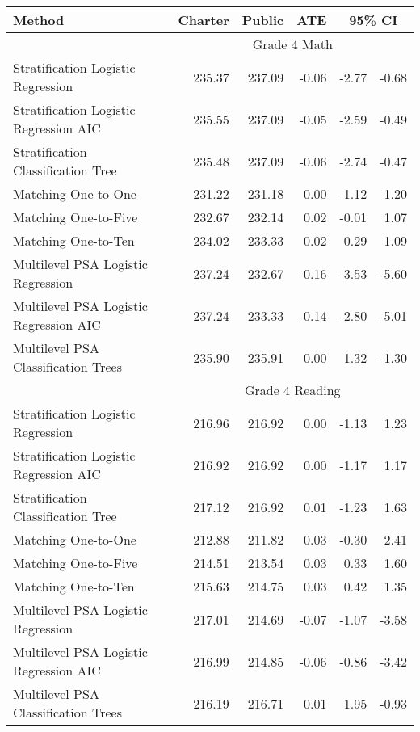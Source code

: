 \begin{table}[ht]
\centering
\begin{tabular}{lrrrrr}
  \hline Method & Charter & Public & ATE & \multicolumn{2}{c}{95\% CI} \\   \hline & \multicolumn{5}{c}{Grade 4 Math} \\ \cline{2-6} Stratification Logistic Regression & 235.37 & 237.09 & -0.06 & -2.77 & -0.68 \\ 
  Stratification Logistic Regression AIC & 235.55 & 237.09 & -0.05 & -2.59 & -0.49 \\ 
  Stratification Classification Tree & 235.48 & 237.09 & -0.06 & -2.74 & -0.47 \\ 
  Matching One-to-One & 231.22 & 231.18 & 0.00 & -1.12 & 1.20 \\ 
  Matching One-to-Five & 232.67 & 232.14 & 0.02 & -0.01 & 1.07 \\ 
  Matching One-to-Ten & 234.02 & 233.33 & 0.02 & 0.29 & 1.09 \\ 
  Multilevel PSA Logistic Regression & 237.24 & 232.67 & -0.16 & -3.53 & -5.60 \\ 
  Multilevel PSA Logistic Regression AIC & 237.24 & 233.33 & -0.14 & -2.80 & -5.01 \\ 
  Multilevel PSA Classification Trees & 235.90 & 235.91 & 0.00 & 1.32 & -1.30 \\ 
    \hline & \multicolumn{5}{c}{Grade 4 Reading} \\ \cline{2-6} Stratification Logistic Regression & 216.96 & 216.92 & 0.00 & -1.13 & 1.23 \\ 
  Stratification Logistic Regression AIC & 216.92 & 216.92 & 0.00 & -1.17 & 1.17 \\ 
  Stratification Classification Tree & 217.12 & 216.92 & 0.01 & -1.23 & 1.63 \\ 
  Matching One-to-One & 212.88 & 211.82 & 0.03 & -0.30 & 2.41 \\ 
  Matching One-to-Five & 214.51 & 213.54 & 0.03 & 0.33 & 1.60 \\ 
  Matching One-to-Ten & 215.63 & 214.75 & 0.03 & 0.42 & 1.35 \\ 
  Multilevel PSA Logistic Regression & 217.01 & 214.69 & -0.07 & -1.07 & -3.58 \\ 
  Multilevel PSA Logistic Regression AIC & 216.99 & 214.85 & -0.06 & -0.86 & -3.42 \\ 
  Multilevel PSA Classification Trees & 216.19 & 216.71 & 0.01 & 1.95 & -0.93 \\ 

\end{tabular}
\end{table}
